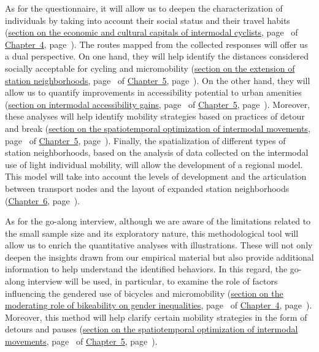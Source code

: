 \begin{refsegment}
As for the questionnaire, it will allow us to deepen the characterization of individuals by taking into account their social status and their travel habits (\hyperref[chap4:capital-economique-culturel]{section on the economic and cultural capitals of intermodal cyclists}, page~\pageref{chap4:capital-economique-culturel} of \hyperref[chap4:titre]{Chapter~4}, page~\pageref{chap4:titre}). The routes mapped from the collected responses will offer us a dual perspective. On one hand, they will help identify the distances considered socially acceptable for cycling and micromobility (\hyperref[chap5:aire-secondaire-quartier-gare]{section on the extension of station neighborhoods}, page~\pageref{chap5:aire-secondaire-quartier-gare} of \hyperref[chap5:titre]{Chapter~5}, page~\pageref{chap5:titre}). On the other hand, they will allow us to quantify improvements in accessibility potential to urban amenities (\hyperref[chap5:accessibilite-intermodale-extension-aire-influence]{section on intermodal accessibility gains}, page~\pageref{chap5:accessibilite-intermodale-extension-aire-influence} of \hyperref[chap5:titre]{Chapter~5}, page~\pageref{chap5:titre}). Moreover, these analyses will help identify mobility strategies based on practices of detour and \gls{break} (\hyperref[chap5:detours-pauses-optimisation]{section on the spatiotemporal optimization of intermodal movements}, page~\pageref{chap5:detours-pauses-optimisation} of \hyperref[chap5:titre]{Chapter~5}, page~\pageref{chap5:titre}). Finally, the spatialization of different types of station neighborhoods, based on the analysis of data collected on the intermodal use of light individual mobility, will allow the development of a regional model. This model will take into account the levels of development and the articulation between transport nodes and the layout of expanded station neighborhoods (\hyperref[chap6:titre]{Chapter~6}, page~\pageref{chap6:titre}).%

As for the go-along interview, although we are aware of the limitations related to the small sample size and its exploratory nature, this methodological tool will allow us to enrich the quantitative analyses with illustrations. These will not only deepen the insights drawn from our empirical material but also provide additional information to help understand the identified behaviors. In this regard, the go-along interview will be used, in particular, to examine the role of factors influencing the gendered use of bicycles and micromobility (\hyperref[section-chap4:cyclabilite-genre]{section on the moderating role of bikeability on gender inequalities}, page~\pageref{section-chap4:cyclabilite-genre} of \hyperref[chap4:titre]{Chapter~4}, page~\pageref{chap4:titre}). Moreover, this  method will help clarify certain mobility strategies in the form of detours and pauses (\hyperref[chap5:detours-pauses-optimisation]{section on the spatiotemporal optimization of intermodal movements}, page~\pageref{chap5:detours-pauses-optimisation} of \hyperref[chap5:titre]{Chapter~5}, page~\pageref{chap5:titre}).%


\end{refsegment}
